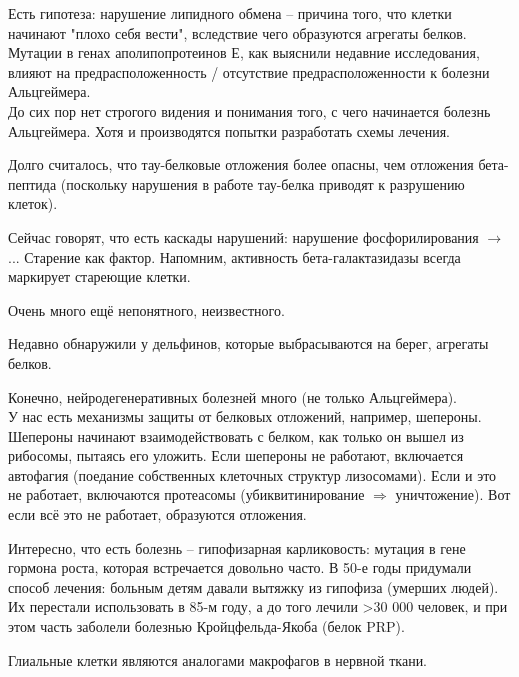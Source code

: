 \documentclass[main.tex]{subfiles}
\begin{document}
Есть гипотеза: нарушение липидного обмена -- причина того, что клетки начинают "плохо себя вести", вследствие чего образуются агрегаты белков.
Мутации в генах аполипопротеинов Е, как выяснили недавние исследования, влияют на предрасположенность / отсутствие предрасположенности к болезни Альцгеймера. \\

До сих пор нет строгого видения и понимания того, с чего начинается болезнь Альцгеймера.
Хотя и производятся попытки разработать схемы лечения.

Долго считалось, что тау-белковые отложения более опасны, чем отложения бета-пептида (поскольку нарушения в работе тау-белка приводят к разрушению клеток).

Сейчас говорят, что есть каскады нарушений: нарушение фосфорилирования $\rightarrow$ ...
Старение как фактор.
Напомним, активность бета-галактазидазы всегда маркирует стареющие клетки.

Очень много ещё непонятного, неизвестного.

Недавно обнаружили у дельфинов, которые выбрасываются на берег, агрегаты белков.

Конечно, нейродегенеративных болезней много (не только Альцгеймера). \\

У нас есть механизмы защиты от белковых отложений, например, шепероны.
Шепероны начинают взаимодействовать с белком, как только он вышел из рибосомы, пытаясь его уложить.
Если шепероны не работают, включается автофагия (поедание собственных клеточных структур лизосомами).
Если и это не работает, включаются протеасомы (убиквитинирование $ \Rightarrow $ уничтожение).
Вот если всё это не работает, образуются отложения.

Интересно, что есть болезнь -- гипофизарная карликовость: мутация в гене гормона роста, которая встречается довольно часто.
В 50-е годы придумали способ лечения: больным детям давали вытяжку из гипофиза (умерших людей).
Их перестали использовать в 85-м году, а до того лечили >30 000 человек, и при этом часть заболели болезнью Кройцфельда-Якоба (белок PRP).

Глиальные клетки являются аналогами макрофагов в нервной ткани.
	
\end{document}
